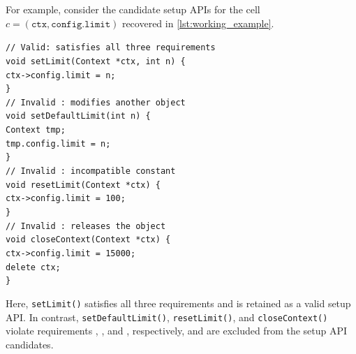 For example, consider the  candidate setup APIs for the cell $c=(\texttt{ctx},\texttt{config.limit})$ recovered in \autoref{lst:working_example}. 
\begin{tcolorbox}[
  colback=gray!3,
  colframe=gray!35,
  boxrule=0.4pt,
  arc=1pt,
  left=5pt,
  right=3pt,
  top=1pt,
  bottom=1pt
]
\small
{\color{gray!70!black}
\verb|// Valid: satisfies all three requirements|}\\
\verb|void setLimit(Context *ctx, int n) {|\\
\hspace*{2em}\verb|ctx->config.limit = n;|\\
\verb|}|\\[3pt]
{\color{gray!70!black}
\verb|// Invalid |\verb|: modifies another object|}\\
\verb|void setDefaultLimit(int n) {|\\
\hspace*{2em}\verb|Context tmp;|\\
\hspace*{2em}\verb|tmp.config.limit = n;|\\
\verb|}|\\[3pt]
{\color{gray!70!black}
\verb|// Invalid |\verb|: incompatible constant|}\\
\verb|void resetLimit(Context *ctx) {|\\
\hspace*{2em}\verb|ctx->config.limit = 100;|\\
\verb|}|\\[3pt]
{\color{gray!70!black}
\verb|// Invalid |\verb|: releases the object|}\\
\verb|void closeContext(Context *ctx) {|\\
\hspace*{2em}\verb|ctx->config.limit = 15000;|\\
\hspace*{2em}\verb|delete ctx;|\\
\verb|}|
\end{tcolorbox}

Here, \texttt{setLimit()} satisfies all three requirements and is retained as a valid setup API.
In contrast, \texttt{setDefaultLimit()}, \texttt{resetLimit()}, and \texttt{closeContext()} violate requirements , , and , respectively, and are excluded from the setup API candidates.



